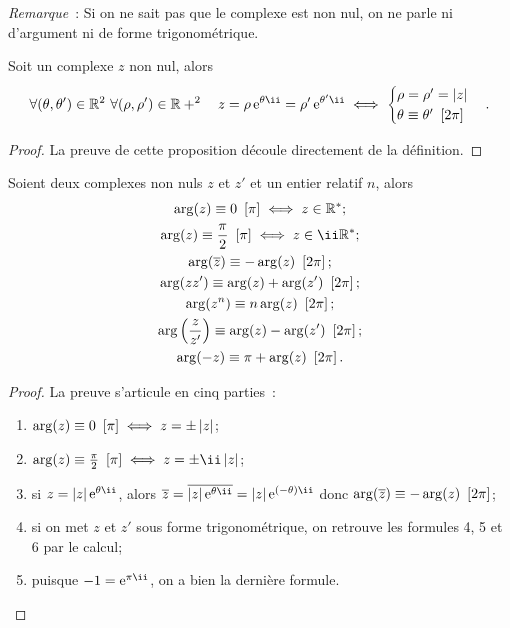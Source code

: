 \emph{Remarque}~: Si on ne sait pas que le complexe est non nul, on ne parle ni d'argument ni de forme trigonométrique.
\begin{prop}
  Soit un complexe $z$ non nul, alors
  \begin{equation}
    \forall (\theta, \theta') \in \R^2 \ \forall (\rho, \rho') \in \R+^2 \quad z=\expc{\rho}{\theta}=\expc{\rho'}{\theta'} \iff 
    \begin{cases} 
      \rho = \rho' = \abs{z} \\
      \congru{\theta}{\theta'}{2\pi}
    \end{cases}.
  \end{equation}
\end{prop}
\begin{proof}
  La preuve de cette proposition découle directement de la définition.
\end{proof}
%
\begin{prop} 
  Soient deux complexes non nuls $z$ et $z'$ et un entier relatif $n$, alors
  \begin{gather}
    \congru{\arg(z)}{0}{\pi} \iff z \in \R^*;\\
    \congru{\arg(z)}{\frac{\pi}{2}}{\pi} \iff z \in \ii\R^{*};\\
    \congru{\arg(\bar{z})}{-\arg(z)}{2\pi};\\
    \congru{\arg(z z')}{\arg(z) + \arg(z')}{2\pi};\\
    \congru{\arg(z^n)}{n \arg(z)}{2\pi};\\
    \congru{\arg \left(\frac{z}{z'} \right)}{\arg(z) - \arg(z') }{2\pi};\\
    \congru{\arg(-z)}{\pi + \arg(z)}{2\pi}.
  \end{gather}
\end{prop}
\begin{proof}
  La preuve s'articule en cinq parties~:
  \begin{enumerate}
  \item $\arg(z) \equiv 0~\left[\pi \right] \iff z = \pm \left\lvert z\right\rvert$;
  \item $\congru{\arg(z)}{\frac{\pi}{2}}{\pi} \iff z = \pm \ii \abs{z}$;
  \item si $z=\expc{\abs{z}}{\theta}$, alors $\bar{z}=\bar{\expc{|z|}{\theta}}=\expc{|z|}{(-\theta)}$ donc $\arg(\overline{z}) \equiv -\arg(z)~\left[2\pi \right]$;
  \item si on met $z$ et $z'$ sous forme trigonométrique, on retrouve les formules 4, 5 et 6 par le calcul;
  \item puisque $-1=\expc{}{\pi}$, on a bien la dernière formule.
  \end{enumerate}
\end{proof}

